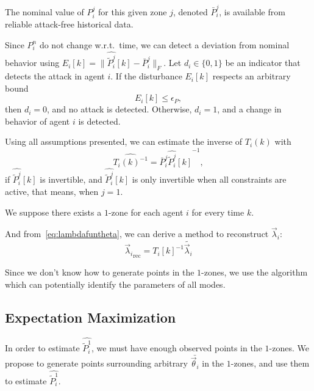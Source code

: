 \documentclass{ifacconf}  %
\begin{document}
\begin{assumption}\label{ass:Pnominal}
  The nominal value of $P_{i}^{j}$ for this given zone $j$, denoted $\bar{P}_{i}^{j}$, is available from reliable attack-free historical data.
\end{assumption}

Since $P_{i}^{n}$ do not change w.r.t.\ time, we can detect a deviation from nominal behavior using ${E_{i}[k] =\|\widehat{\tilde{P}_{i}^{j}}[k]-\bar{P}_{i}^{j}\|_{F}}$.
Let ${d_{i}\in\{0,1\}}$ be an indicator that detects the attack in agent $i$.
If the disturbance $E_{i}[k]$ respects an arbitrary bound
\begin{equation}
  \label{eq:2}
  E_{i}[k]\leq\epsilon_{P},
\end{equation}
then  ${d_{i}=0}$, and no attack is detected. Otherwise, ${d_{i}=1}$, and a change in behavior of agent $i$ is detected.

Using all assumptions presented, we can estimate the inverse of $T_{i}(k)$ with
\begin{equation*}
\widehat{{T_{i}(k)}^{-1}}=\bar{P}_{i}^{j}{\widehat{\tilde{P}_{i}^{j}}[k]}^{-1},
\end{equation*}
if $\widehat{\tilde{P}_{i}^{j}}[k]$ is invertible, and $\widehat{\tilde{P}_{i}^{j}}[k]$ is only invertible when all constraints are active, that means, when ${j=1}$.
\begin{assumption}
  We suppose there exists a $1$-zone for each agent $i$ for every time $k$.
\end{assumption}
And from~\eqref{eq:lambdafuntheta}, we can derive a method to reconstruct $\vec{\lambda}_{i}$:
\begin{equation}
  \label{eq:lambdareconstruction}
  {\vec{\lambda}_{i}}_{\mathrm{rec}}=\widehat{{T_{i}[k]}^{-1}} \tilde{\vec{\lambda}_{i}}
\end{equation}

Since we don't know how to generate points in the $1$-zones, we use the \EM{} algorithm which can potentially identify the parameters of all modes.

\subsection{Expectation Maximization}
In order to estimate $\widehat{\tilde{P}_{i}^{1}}$, we must have enough observed points in the $1$-zones.
We propose to generate points surrounding arbitrary $\bar{\vec{\theta}_{i}}$ in the $1$-zones, and use them to estimate $\widehat{\tilde{P}_{i}^{1}}$.
\end{document}
